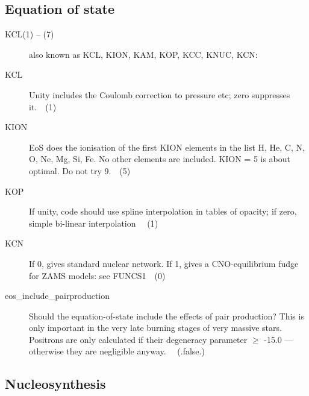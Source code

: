 \subsection{Equation of state}
\label{sec:initdat:eos}
\begin{description}
\item[KCL(1) -- (7)] also known as KCL, KION, KAM, KOP, KCC, KNUC, KCN:
\item[KCL]\hypertarget{kcl}{} Unity includes the Coulomb correction to pressure etc; zero suppresses it.\ \ (1)
\item[KION]\hypertarget{kion}{} EoS does the ionisation of the first KION elements in the list H, He, C, N, O, Ne, Mg, Si, Fe. 
  No other elements are included. KION = 5 is about optimal. Do not try 9.\ \ (5)
\item[KOP]\hypertarget{kop}{} If unity, code should use spline interpolation in tables of opacity; if zero, simple bi-linear interpolation \ \ (1)
\item[KCN]\hypertarget{kcn}{} If 0, gives standard nuclear network. If 1, gives a CNO-equilibrium fudge for ZAMS models: see FUNCS1\ \  (0)
\item[eos\_include\_pairproduction]\hypertarget{eos_include_pairproduction}{} Should the equation-of-state include the effects of pair production?  
  This is only important in the very late burning stages of very massive stars. Positrons are only calculated if their degeneracy parameter $\geq$ -15.0 --- otherwise they are negligible anyway.  \ \ (.false.)
\end{description}




\subsection{Nucleosynthesis}
\label{sec:initdat:nucleosynthesis}

